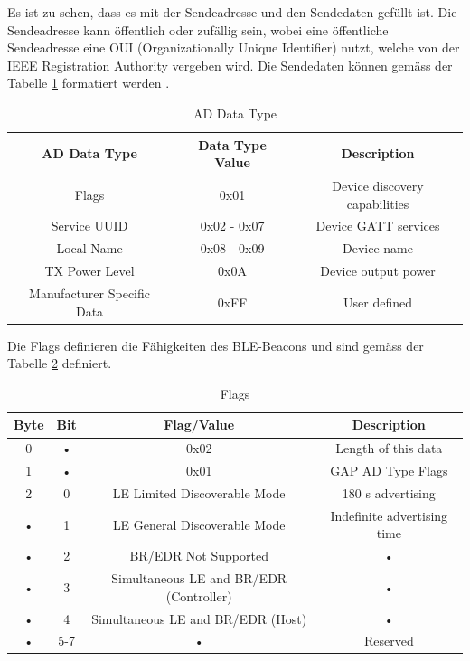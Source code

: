 Es ist zu sehen, dass es mit der Sendeadresse und den Sendedaten gefüllt ist. Die Sendeadresse kann öffentlich oder zufällig sein, wobei eine öffentliche Sendeadresse eine OUI (Organizationally Unique Identifier) nutzt, welche von der IEEE Registration Authority vergeben wird. Die Sendedaten können gemäss der  Tabelle \ref{tab:AD_Data_Type} formatiert werden \cite{9_Teildokument_BT}.

\begin{table}[htbp!!!]
\begin{tabular}{|c|c|c|}
\hline 
\rule[-1ex]{0pt}{2.5ex} AD Data Type & Data Type Value & Description \\ 
\hline 
\rule[-1ex]{0pt}{2.5ex} Flags & 0x01 & Device discovery capabilities \\ 
\hline 
\rule[-1ex]{0pt}{2.5ex} Service UUID & 0x02 - 0x07 & Device GATT services \\ 
\hline 
\rule[-1ex]{0pt}{2.5ex} Local Name & 0x08 - 0x09 & Device name \\ 
\hline 
\rule[-1ex]{0pt}{2.5ex} TX Power Level & 0x0A & Device output power \\ 
\hline 
\rule[-1ex]{0pt}{2.5ex} Manufacturer Specific Data & 0xFF & User defined \\ 
\hline 
\end{tabular} 
\caption[AD Data Type]{AD Data Type \cite{9_Teildokument_BT}}
\label{tab:AD_Data_Type}
\end{table}

Die Flags definieren die Fähigkeiten des BLE-Beacons und sind gemäss der Tabelle \ref{tab:Flags} definiert.

\begin{table}[htbp!!!]
\begin{tabular}{|c|c|c|c|}
\hline 
\rule[-1ex]{0pt}{2.5ex} Byte & Bit & Flag/Value & Description \\ 
\hline 
\rule[-1ex]{0pt}{2.5ex} 0 & • & 0x02 & Length of this data \\ 
\hline 
\rule[-1ex]{0pt}{2.5ex} 1 & • & 0x01 & GAP AD Type Flags \\ 
\hline 
\rule[-1ex]{0pt}{2.5ex} 2 & 0 & LE Limited Discoverable Mode & 180 s advertising \\ 
\hline 
\rule[-1ex]{0pt}{2.5ex} • & 1 & LE General Discoverable Mode & Indefinite advertising time \\ 
\hline 
\rule[-1ex]{0pt}{2.5ex} • & 2 & BR/EDR Not Supported & • \\ 
\hline 
\rule[-1ex]{0pt}{2.5ex} • & 3 & Simultaneous LE and BR/EDR (Controller) & • \\ 
\hline 
\rule[-1ex]{0pt}{2.5ex} • & 4 & Simultaneous LE and BR/EDR (Host) & • \\ 
\hline 
\rule[-1ex]{0pt}{2.5ex} • & 5-7 & • & Reserved \\ 
\hline 
\end{tabular} 
\caption[Flags]{Flags \cite{9_Teildokument_BT} \cite{9_Teildokument_BT}}
\label{tab:Flags}
\end{table}

